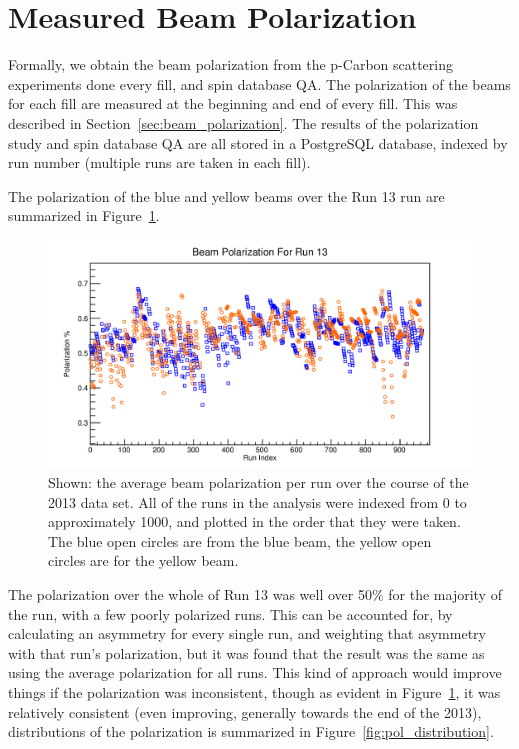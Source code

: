 \section{Measured Beam Polarization}
\label{sec:measured_beam_polarization}

Formally, we obtain the beam polarization from the p-Carbon scattering
experiments done every fill, and spin database QA. The polarization of the beams
for each fill are measured at the beginning and end of every fill. This was
described in Section~\ref{sec:beam_polarization}. The results of the
polarization study and spin database QA are all stored in a PostgreSQL database,
indexed by run number (multiple runs are taken in each fill).

The polarization of the blue and yellow beams over the Run 13 run are summarized
in Figure~\ref{fig:avg_polarization}.

\begin{figure}[ht]
  \centering
  \includegraphics[width=\linewidth]{./figures/beam_polarization.jpg}
  \caption{
    Shown: the average beam polarization per run over the course of the 2013
    data set. All of the runs in the analysis were indexed from 0 to
    approximately 1000, and plotted in the order that they were taken. The blue
    open circles are from the blue beam, the yellow open circles are for the
    yellow beam.
  }
  \label{fig:avg_polarization}
\end{figure}

The polarization over the whole of Run 13 was well over 50\% for the majority of
the run, with a few poorly polarized runs. This can be accounted for, by
calculating an asymmetry for every single run, and weighting that asymmetry with
that run's polarization, but it was found that the result was the same as using
the average polarization for all runs. This kind of approach would improve
things if the polarization was inconsistent, though as evident in
Figure~\ref{fig:avg_polarization}, it was relatively consistent (even improving,
generally towards the end of the 2013), distributions of the polarization is
summarized in Figure~\ref{fig:pol_distribution}.

